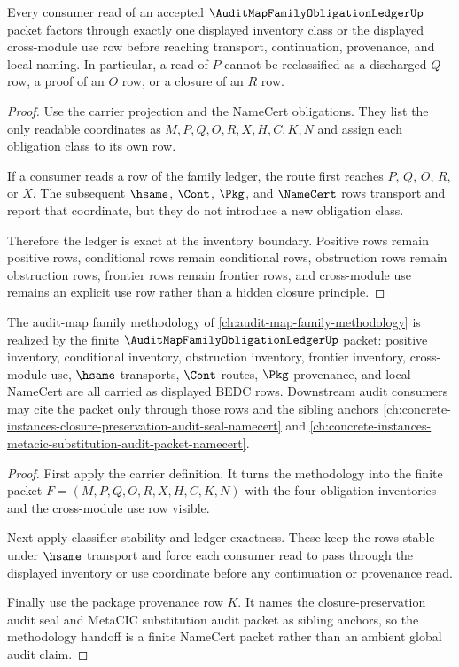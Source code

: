 \begin{theorem}
\label{thm:audit-map-family-ledger-exactness}
Every consumer read of an accepted $\AuditMapFamilyObligationLedgerUp$ packet factors through exactly one displayed inventory class or the displayed cross-module use row before reaching transport, continuation, provenance, and local naming. In particular, a read of $P$ cannot be reclassified as a discharged $Q$ row, a proof of an $O$ row, or a closure of an $R$ row.
\end{theorem}
\begin{proof}
Use the carrier projection and the NameCert obligations. They list the only readable coordinates as $M,P,Q,O,R,X,H,C,K,N$ and assign each obligation class to its own row.

If a consumer reads a row of the family ledger, the route first reaches $P$, $Q$, $O$, $R$, or $X$. The subsequent $\hsame$, $\Cont$, $\Pkg$, and $\NameCert$ rows transport and report that coordinate, but they do not introduce a new obligation class.

Therefore the ledger is exact at the inventory boundary. Positive rows remain positive rows, conditional rows remain conditional rows, obstruction rows remain obstruction rows, frontier rows remain frontier rows, and cross-module use remains an explicit use row rather than a hidden closure principle.
\end{proof}

\begin{theorem}
\label{thm:audit-map-family-ledger-methodology-handoff}
The audit-map family methodology of \autoref{ch:audit-map-family-methodology} is realized by the finite $\AuditMapFamilyObligationLedgerUp$ packet: positive inventory, conditional inventory, obstruction inventory, frontier inventory, cross-module use, $\hsame$ transports, $\Cont$ routes, $\Pkg$ provenance, and local NameCert are all carried as displayed BEDC rows. Downstream audit consumers may cite the packet only through those rows and the sibling anchors \autoref{ch:concrete-instances-closure-preservation-audit-seal-namecert} and \autoref{ch:concrete-instances-metacic-substitution-audit-packet-namecert}.
\end{theorem}
\begin{proof}
First apply the carrier definition. It turns the methodology into the finite packet $F=(M,P,Q,O,R,X,H,C,K,N)$ with the four obligation inventories and the cross-module use row visible.

Next apply classifier stability and ledger exactness. These keep the rows stable under $\hsame$ transport and force each consumer read to pass through the displayed inventory or use coordinate before any continuation or provenance read.

Finally use the package provenance row $K$. It names the closure-preservation audit seal and MetaCIC substitution audit packet as sibling anchors, so the methodology handoff is a finite NameCert packet rather than an ambient global audit claim.
\end{proof}

